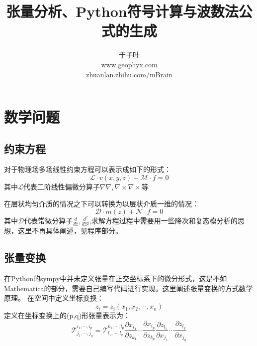 \documentclass[UTF8]{article}
\author{于子叶\\www.geophyx.com\\zhuanlan.zhihu.com/mBrain}
\date{}
\title{张量分析、Python符号计算与波数法公式的生成}
\begin{document}
    \maketitle
    \section{数学问题}
        \subsection{约束方程}
            
对于物理场多场线性约束方程可以表示成如下的形式：
\begin{equation}
\mathcal{L}\cdot {v}(x,y,z)+\mathcal{M}\cdot {f}=0
\end{equation}
其中$\mathcal{L}$代表二阶线性偏微分算子$\nabla\nabla,\nabla\times\nabla\times$等

在层状均匀介质的情况之下可以转换为以层状介质一维的情况：
\begin{equation}
\mathcal{D} \cdot {m}(z)+\mathcal{N} \cdot {f}=0
\end{equation}
其中$\mathcal{D}$代表常微分算子$\frac{d}{dz},\frac{d^2}{dz^2}$,求解方程过程中需要用一些降次和复态模分析的思想，这里不再具体阐述，见程序部分。
        \subsection{张量变换}
在Python的sympy中并未定义张量在正交坐标系下的微分形式，这是不如Mathematica的部分，需要自己编写代码进行实现。这里阐述张量变换的方式数学原理。
在空间中定义坐标变换：
\begin{equation}
z_i=z_i(x_1,x_2,\cdots,x_n)
\end{equation}
定义在坐标变换上的(p,q)形张量表示为：
\begin{equation}
\mathcal{T}^{i_1,\cdots,i_p}_{j_1,\cdots,j_q}
=
\mathcal{T}^{k_1,\cdots,l_p}_{l_1,\cdots,l_q}
\frac{\partial x_{i_1}}{\partial z_{k_1}}
\cdots
\frac{\partial x_{i_p}}{\partial z_{k_p}}
\frac{\partial z_{l_1}}{\partial x_{j_1}}
\cdots
\frac{\partial z_{l_q}}{\partial x_{j_q}}
\end{equation}
\end{document}
